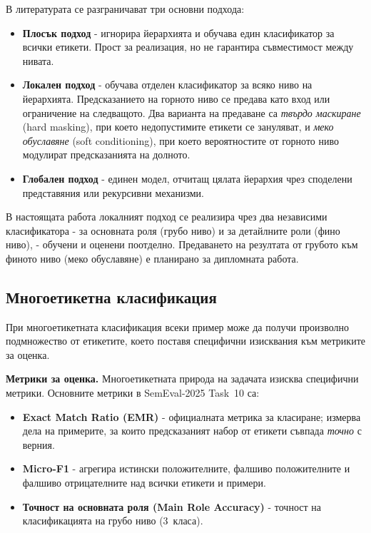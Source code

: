 \documentclass[12pt,a4paper]{report}
\begin{document}
В литературата се разграничават три основни подхода:
\begin{itemize}
  \item \textbf{Плосък подход} - игнорира йерархията и обучава един класификатор за всички етикети. Прост за реализация, но не гарантира съвместимост между нивата.
  \item \textbf{Локален подход} - обучава отделен класификатор за всяко ниво на йерархията. Предсказанието на горното ниво се предава като вход или ограничение на следващото. Два варианта на предаване са \textit{твърдо маскиране} (hard masking), при което недопустимите етикети се зануляват, и \textit{меко обуславяне} (soft conditioning), при което вероятностите от горното ниво модулират предсказанията на долното.
  \item \textbf{Глобален подход} - единен модел, отчитащ цялата йерархия чрез споделени представяния или рекурсивни механизми.
\end{itemize}

В настоящата работа локалният подход се реализира чрез два независими класификатора - за основната роля (грубо ниво) и за детайлните роли (фино ниво), - обучени и оценени поотделно. Предаването на резултата от грубото към финото ниво (меко обуславяне) е планирано за дипломната работа.

\subsection{Многоетикетна класификация}

При многоетикетната класификация всеки пример може да получи произволно подмножество от етикетите, което поставя специфични изисквания към метриките за оценка.

\textbf{Метрики за оценка.} Многоетикетната природа на задачата изисква специфични метрики. Основните метрики в SemEval-2025 Task~10 са:
\begin{itemize}
  \item \textbf{Exact Match Ratio (EMR)} - официалната метрика за класиране; измерва дела на примерите, за които предсказаният набор от етикети съвпада \textit{точно} с верния.
  \item \textbf{Micro-F1} - агрегира истински положителните, фалшиво положителните и фалшиво отрицателните над всички етикети и примери.
  \item \textbf{Точност на основната роля (Main Role Accuracy)} - точност на класификацията на грубо ниво (3~класа).
\end{itemize}
\end{document}
